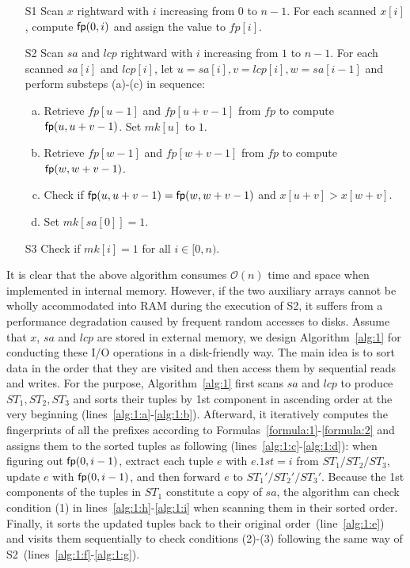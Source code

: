 \documentclass[10pt,journal,compsoc]{IEEEtran}
\begin{document}
\begin{enumerate}
	\item [S1]
	Scan $x$ rightward with $i$ increasing from $0$ to $n - 1$. For each scanned $x[i]$, compute ${\sf fp}(0, i)$ and assign the value to $fp[i]$.
	
	\item [S2]
	Scan $sa$ and $lcp$ rightward with $i$ increasing from $1$ to $n - 1$. For each scanned $sa[i]$ and $lcp[i]$, let $u = sa[i], v = lcp[i], w = sa[i - 1]$ and perform substeps (a)-(c) in sequence:
	
	\begin{enumerate}[(a)]
		\item
		Retrieve $fp[u - 1]$ and $fp[u + v - 1]$ from $fp$ to compute ${\sf fp}(u, u + v - 1)$. Set $mk[u]$ to $1$.
		
		\item
		Retrieve $fp[w - 1]$ and $fp[w + v - 1]$ from $fp$ to compute ${\sf fp}(w, w + v - 1)$.
		
		\item
		Check if ${\sf fp}(u, u + v - 1) = {\sf fp}(w, w + v - 1)$ and $x[u + v] > x[w + v]$.
		
		\item
		Set $mk[sa[0]] = 1$.
	\end{enumerate}

	\item [S3] Check if $mk[i] = 1$ for all $i \in [0, n)$.
	
\end{enumerate}

It is clear that the above algorithm consumes $\mathcal{O}(n)$ time and space when implemented in internal memory. However, if the two auxiliary arrays cannot be wholly accommodated into RAM during the execution of S2, it suffers from a performance degradation caused by frequent random accesses to disks. Assume that $x$, $sa$ and $lcp$ are stored in external memory, we design Algorithm~\ref{alg:1} for conducting these I/O operations in a disk-friendly way. The main idea is to sort data in the order that they are visited and then access them by sequential reads and writes. For the purpose, Algorithm~\ref{alg:1} first scans $sa$ and $lcp$ to produce $ST_1, ST_2, ST_3$ and sorts their tuples by 1st component in ascending order at the very beginning (lines~\ref{alg:1:a}-\ref{alg:1:b}). Afterward, it iteratively computes the fingerprints of all the prefixes according to Formulas~\ref{formula:1}-\ref{formula:2} and assigns them to the sorted tuples as following (lines~\ref{alg:1:c}-\ref{alg:1:d}): when figuring out ${\sf fp}(0, i - 1)$, extract each tuple $e$ with $e.1st = i$ from $ST_1/ST_2/ST_3$, update $e$  with ${\sf fp}(0, i - 1)$, and then forward $e$ to $ST_1'/ST_2'/ST_3'$. Because the 1st components of the tuples in $ST_1$ constitute a copy of $sa$, the algorithm can check condition (1) in lines~\ref{alg:1:h}-\ref{alg:1:i} when scanning them in their sorted order. Finally, it sorts the updated tuples back to their original order~(line~\ref{alg:1:e}) and visits them  sequentially to check conditions (2)-(3) following the same way of S2~(lines~\ref{alg:1:f}-\ref{alg:1:g}).  
\end{document}
